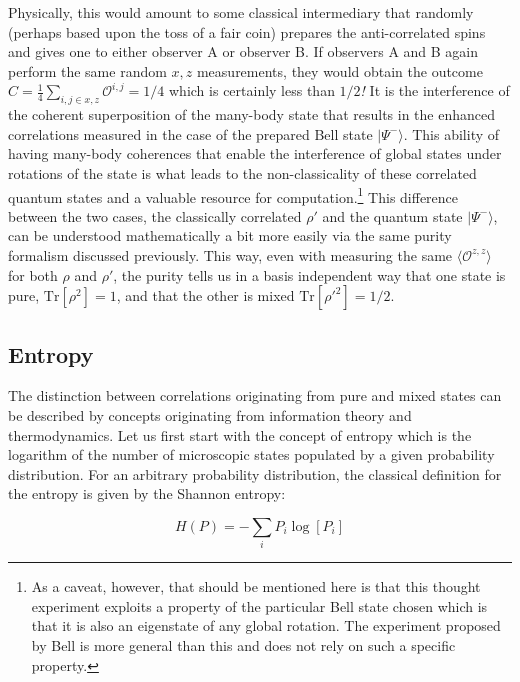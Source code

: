 Physically, this would amount to some classical intermediary that randomly (perhaps based upon the toss of a fair coin) prepares the anti-correlated spins and gives one to either observer A or observer B. If observers A and B again perform the same random $x,z$ measurements, they would obtain the outcome $C=\frac{1}{4} \sum_{i,j\in x,z} \mathcal{O}^{i,j}= 1/4$ which is certainly less than $1/2$\emph{!} It is the interference of the coherent superposition of the many-body state that results in the enhanced correlations measured in the case of the prepared Bell state $|\Psi^-\rangle$. This ability of having many-body coherences that enable the interference of global states under rotations of the state is what leads to the non-classicality of these correlated quantum states and a valuable resource for computation.\footnote{ As a caveat, however, that should be mentioned here is that this thought experiment exploits a property of the particular Bell state chosen which is that it is also an eigenstate of any global rotation. The experiment proposed by Bell is more general than this and does not rely on such a specific property.}
This difference between the two cases, the classically correlated $\rho'$ and the quantum state $| \Psi^-\rangle$, can be understood mathematically a bit more easily via the same purity formalism discussed previously. This way, even with measuring the same $\langle \mathcal{O}^{z,z} \rangle$ for both $\rho$ and $\rho'$, the purity tells us in a basis independent way that one state is pure, $\mathrm{Tr}[\rho^2]=1$, and that the other is mixed $\mathrm{Tr}[\rho'^2]=1/2$.

\subsection{Entropy}

The distinction between correlations originating from pure and mixed states can be described by concepts originating from information theory and thermodynamics.  Let us first start with the concept of entropy which is the logarithm of the number of microscopic states populated by a given probability distribution. For an arbitrary probability distribution, the classical definition for the entropy is given by the Shannon entropy:

\begin{equation}
\label{eqn:H}
H(P) = - \sum_i P_i \log[P_i] 
\end{equation}

